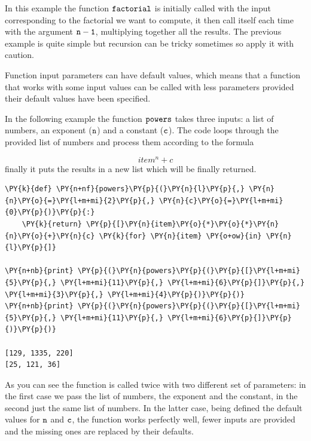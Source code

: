 In this example the function $\tt{factorial}$ is initially called with the input corresponding 
to the factorial we want to compute, it then call itself each time with the argument $\tt{n-1}$, 
multiplying together all the results.
The previous example is quite simple but recursion can be tricky sometimes so apply it with caution. 

Function input parameters can have default values, which means that a function that works 
with some input values can be called with less parameters provided their default values have been specified.

In the following example the function $\tt{powers}$ takes three inputs: a list of numbers, 
an exponent ($\tt{n}$) and a constant ($\tt{c}$). The code loops through the provided list 
of numbers and process them according to the formula 

\[
item^{n} + c
\]
finally it puts the results in a new list which will be finally returned.

\begin{codebox}[breakable, size=fbox, boxrule=1pt, pad at break*=1mm,colback=cellbackground, colframe=cellborder]
\begin{Verbatim}[commandchars=\\\{\}]
\PY{k}{def} \PY{n+nf}{powers}\PY{p}{(}\PY{n}{l}\PY{p}{,} \PY{n}{n}\PY{o}{=}\PY{l+m+mi}{2}\PY{p}{,} \PY{n}{c}\PY{o}{=}\PY{l+m+mi}{0}\PY{p}{)}\PY{p}{:}
    \PY{k}{return} \PY{p}{[}\PY{n}{item}\PY{o}{*}\PY{o}{*}\PY{n}{n}\PY{o}{+}\PY{n}{c} \PY{k}{for} \PY{n}{item} \PY{o+ow}{in} \PY{n}{l}\PY{p}{]}

\PY{n+nb}{print} \PY{p}{(}\PY{n}{powers}\PY{p}{(}\PY{p}{[}\PY{l+m+mi}{5}\PY{p}{,} \PY{l+m+mi}{11}\PY{p}{,} \PY{l+m+mi}{6}\PY{p}{]}\PY{p}{,} \PY{l+m+mi}{3}\PY{p}{,} \PY{l+m+mi}{4}\PY{p}{)}\PY{p}{)}
\PY{n+nb}{print} \PY{p}{(}\PY{n}{powers}\PY{p}{(}\PY{p}{[}\PY{l+m+mi}{5}\PY{p}{,} \PY{l+m+mi}{11}\PY{p}{,} \PY{l+m+mi}{6}\PY{p}{]}\PY{p}{)}\PY{p}{)}

[129, 1335, 220]
[25, 121, 36]
\end{Verbatim}
\end{codebox}
    
As you can see the function is called twice with two different set of parameters: in the first 
case we pass the list of numbers, the exponent and the constant, in the second just the same 
list of numbers.
In the latter case, being defined the default values for $\tt{n}$ and $\tt{c}$, the function 
works perfectly well, fewer inputs are provided and the missing ones are replaced by their defaults. 

